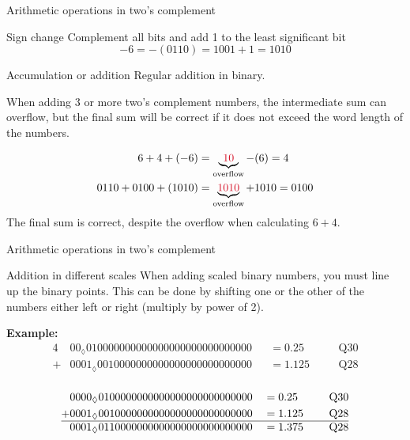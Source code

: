 \documentclass[10pt, handout]{beamer}
\begin{document}
%
\begin{frame}{Arithmetic operations in two's complement}
	\begin{block}{Sign change}
		Complement all bits and add 1 to the least significant bit
		\begin{equation*}
		-6 = -(0110) = 1001 + 1 = 1010
		\end{equation*}
	\end{block}

	\begin{block}{Accumulation or addition}
		Regular addition in binary.
		
		When adding 3 or more two's complement numbers, the intermediate sum can overflow, but the final sum will be correct if it does not exceed the word length of the numbers.
		
		\begin{align*}
			6 + 4 + (-6) &= \underbrace{{\color{red2} 10}}_{\text{overflow}} - (6) = 4 \\
			0110 + 0100 + (1010) &= \underbrace{{\color{red2} 1010}}_{\text{overflow}} + 1010 = 0100
		\end{align*}
		The final sum is correct, despite the overflow when calculating $6+4$. 
	\end{block}
\end{frame}

%
\begin{frame}{Arithmetic operations in two's complement}
\begin{block}{Addition in different scales}
	When adding scaled binary numbers, you must line up the binary points. This can be done by shifting one or the other of the numbers either left or right (multiply by power of 2).
	
	\textbf{Example:}
	\begin{alignat*}{4}
	&00_\lozenge 	  010000000000000000000000000000 &&= 0.25 &&&~\text{Q30} \\
	+ & 0001_\lozenge 0010000000000000000000000000 &&= 1.125 &&&~\text{Q28} \\
	\end{alignat*}
	
	\begin{alignat*}{4}
	&0000_\lozenge 0100000000000000000000000000 &&= 0.25 &&&~\text{Q30} \\
	+ & 0001_\lozenge 0010000000000000000000000000 &&= 1.125 &&&~\text{Q28} \\
	\hline
	&0001_\lozenge 0110000000000000000000000000 &&= 1.375 &&&~\text{Q28} \\
	\end{alignat*}	
\end{block}
\end{frame}
\end{document}

